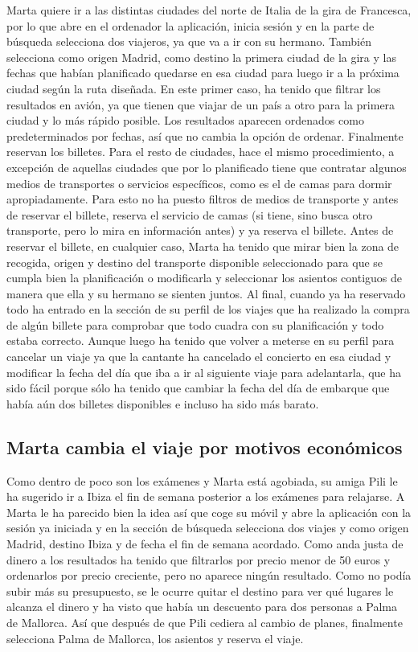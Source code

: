 Marta quiere ir a las distintas ciudades del norte de Italia de la gira de Francesca, por lo que abre en el ordenador la aplicación, inicia sesión y en la parte de búsqueda selecciona dos viajeros, ya que va a ir con su hermano. También selecciona como origen Madrid, como destino la primera ciudad de la gira y las fechas que habían planificado quedarse en esa ciudad para luego ir a la próxima ciudad según la ruta diseñada. En este primer caso, ha tenido que filtrar los resultados en avión, ya que tienen que viajar de un país a otro para la primera ciudad y lo más rápido posible. Los resultados aparecen ordenados como predeterminados por fechas, así que no cambia la opción de ordenar. Finalmente reservan los billetes.
Para el resto de ciudades, hace el mismo procedimiento, a excepción de aquellas ciudades que por lo planificado tiene que contratar algunos medios de transportes o servicios específicos, como es el de camas para dormir apropiadamente. Para esto no ha puesto filtros de medios de transporte y antes de reservar el billete, reserva el servicio de camas (si tiene, sino busca otro transporte, pero lo mira en información antes) y ya reserva el billete.
Antes de reservar el billete, en cualquier caso, Marta ha tenido que mirar bien la zona de recogida, origen y destino del transporte disponible seleccionado para que se cumpla bien la planificación o modificarla y seleccionar los asientos contiguos de manera que ella y su hermano se sienten juntos.
Al final, cuando ya ha reservado todo ha entrado en la sección de su perfil de los viajes que ha realizado la compra de algún billete para comprobar que todo cuadra con su planificación y todo estaba correcto. Aunque luego ha tenido que volver a meterse en su perfil para cancelar un viaje ya que la cantante ha cancelado el concierto en esa ciudad y modificar la fecha del día que iba a ir al siguiente viaje para adelantarla, que ha sido fácil porque sólo ha tenido que cambiar la fecha del día de embarque que había aún dos billetes disponibles e incluso ha sido más barato.

\subsection{Marta cambia el viaje por motivos económicos}

Como dentro de poco son los exámenes y Marta está agobiada, su amiga Pili le ha sugerido ir a Ibiza el fin de semana posterior a los exámenes para relajarse. A Marta le ha parecido bien la idea así que coge su móvil y abre la aplicación con la sesión ya iniciada y en la sección de búsqueda selecciona dos viajes y como origen Madrid, destino Ibiza y de fecha el fin de semana acordado. Como anda justa de dinero a los resultados ha tenido que filtrarlos por precio menor de 50 euros y ordenarlos por precio creciente, pero no aparece ningún resultado. Como no podía subir más su presupuesto, se le ocurre quitar el destino para ver qué lugares le alcanza el dinero y ha visto que había un descuento para dos personas a Palma de Mallorca. Así que  después de que Pili cediera al cambio de planes, finalmente selecciona Palma de Mallorca, los asientos y reserva el viaje.

